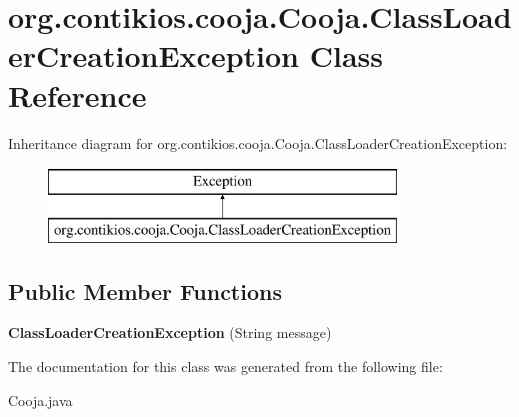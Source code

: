 \hypertarget{classorg_1_1contikios_1_1cooja_1_1Cooja_1_1ClassLoaderCreationException}{\section{org.\-contikios.\-cooja.\-Cooja.\-Class\-Loader\-Creation\-Exception Class Reference}
\label{classorg_1_1contikios_1_1cooja_1_1Cooja_1_1ClassLoaderCreationException}
}
Inheritance diagram for org.\-contikios.\-cooja.\-Cooja.\-Class\-Loader\-Creation\-Exception\-:\begin{figure}[H]
\begin{center}
\leavevmode
\includegraphics[height=2.000000cm]{classorg_1_1contikios_1_1cooja_1_1Cooja_1_1ClassLoaderCreationException}
\end{center}
\end{figure}
\subsection*{Public Member Functions}
\begin{DoxyCompactItemize}
\item 
\hypertarget{classorg_1_1contikios_1_1cooja_1_1Cooja_1_1ClassLoaderCreationException_a63b8dd151fb6c1f0bc3477fc28167d5a}{{\bfseries Class\-Loader\-Creation\-Exception} (String message)}\label{classorg_1_1contikios_1_1cooja_1_1Cooja_1_1ClassLoaderCreationException_a63b8dd151fb6c1f0bc3477fc28167d5a}

\end{DoxyCompactItemize}


The documentation for this class was generated from the following file\-:\begin{DoxyCompactItemize}
\item 
Cooja.\-java\end{DoxyCompactItemize}
